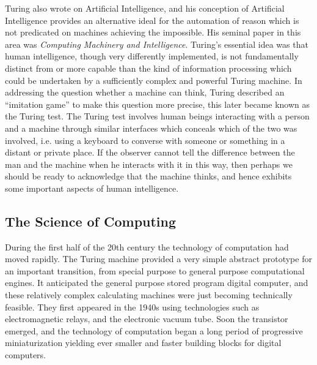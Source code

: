 Turing also wrote on Artificial Intelligence, and his conception of
Artificial Intelligence provides an alternative ideal for the
automation of reason which is not predicated on machines achieving the
impossible.
His seminal paper in this area was \emph{Computing Machinery and Intelligence}\cite{turingCMI}.
Turing's essential idea was that human intelligence, though very
differently implemented, is not fundamentally distinct from or more
capable than the kind of information processing which could be
undertaken by a sufficiently complex and powerful Turing machine.
In addressing the question whether a machine can think, Turing
described an ``imitation game'' to make this question more precise,
this later became known as the Turing test.
The Turing test involves human beings interacting with a person and a
machine through similar interfaces which conceals which of the two was
involved, i.e. using a keyboard to converse with someone or something
in a distant or private place.
If the observer cannot tell the difference between the man and the
machine when he interacts with it in this way, then perhaps we should
be ready to acknowledge that the machine thinks, and hence exhibits
some important aspects of human intelligence.

\subsection{The Science of Computing}

During the first half of the 20th century the technology of
computation had  moved rapidly.
The Turing machine provided a very simple abstract prototype for an
important transition, from special purpose to general purpose
computational engines.
It anticipated the general purpose stored program digital computer,
and these relatively complex calculating machines were just becoming
technically feasible.
They first appeared in the 1940s using technologies such as
electromagnetic relays, and the electronic vacuum tube.
Soon the transistor emerged, and the technology of computation began a
long period of progressive miniaturization yielding ever smaller and
faster building blocks for digital computers.

